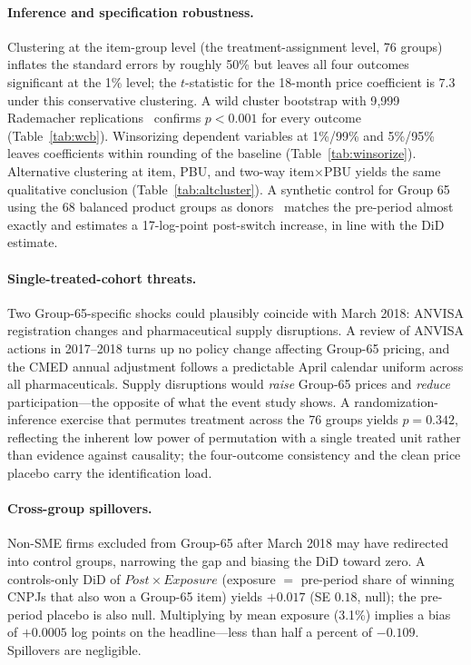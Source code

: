 \paragraph{Inference and specification robustness.}
Clustering at the item-group level (the treatment-assignment level, 76 groups) inflates the standard errors by roughly 50\% but leaves all four outcomes significant at the 1\% level; the $t$-statistic for the 18-month price coefficient is $7.3$ under this conservative clustering. A wild cluster bootstrap with 9{,}999 Rademacher replications~\citep{cameron2008} confirms $p<0.001$ for every outcome (Table~\ref{tab:wcb}). Winsorizing dependent variables at 1\%/99\% and 5\%/95\% leaves coefficients within rounding of the baseline (Table~\ref{tab:winsorize}). Alternative clustering at item, PBU, and two-way item$\times$PBU yields the same qualitative conclusion (Table~\ref{tab:altcluster}). A synthetic control for Group 65 using the 68 balanced product groups as donors~\citep{abadie2010, ben2021} matches the pre-period almost exactly and estimates a 17-log-point post-switch increase, in line with the DiD estimate.

\paragraph{Single-treated-cohort threats.}
Two Group-65-specific shocks could plausibly coincide with March 2018: ANVISA registration changes and pharmaceutical supply disruptions. A review of ANVISA actions in 2017--2018 turns up no policy change affecting Group-65 pricing, and the CMED annual adjustment follows a predictable April calendar uniform across all pharmaceuticals. Supply disruptions would \emph{raise} Group-65 prices and \emph{reduce} participation---the opposite of what the event study shows. A randomization-inference exercise that permutes treatment across the 76 groups yields $p=0.342$, reflecting the inherent low power of permutation with a single treated unit rather than evidence against causality; the four-outcome consistency and the clean price placebo carry the identification load.

\paragraph{Cross-group spillovers.}
Non-SME firms excluded from Group-65 after March 2018 may have redirected into control groups, narrowing the gap and biasing the DiD toward zero. A controls-only DiD of $\mathit{Post} \times \mathit{Exposure}$ (exposure $=$ pre-period share of winning CNPJs that also won a Group-65 item) yields $+0.017$ (SE $0.18$, null); the pre-period placebo is also null. Multiplying by mean exposure (3.1\%) implies a bias of $+0.0005$ log points on the headline---less than half a percent of $-0.109$. Spillovers are negligible.


